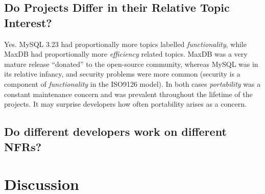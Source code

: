 \documentclass[smallextended]{svjour3}       %
\begin{document}
\subsection{Do Projects Differ in their Relative  Topic Interest?}
Yes. MySQL 3.23 had proportionally more
topics labelled \emph{functionality}, while MaxDB had proportionally more
\emph{efficiency} related topics. MaxDB was a very mature release ``donated'' to the open-source community, 
whereas MySQL was in its relative infancy, and  
security problems were more common (security is a component of \emph{functionality} in the ISO9126 model). 
In both cases \emph{portability} was a constant maintenance concern and was prevalent throughout the lifetime of the projects. It may surprise developers how often portability arises as a concern.


\subsection{Do different developers work on different NFRs?}

\section{Discussion}
\label{sec:limit}

\end{document}
